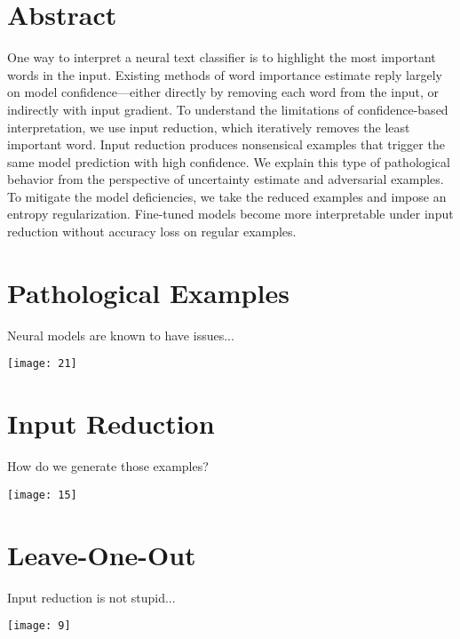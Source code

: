 \documentclass[a0,portrait]{a0poster}
\begin{document}
\begin{multicols}{2}

\large

\section*{Abstract}
One way to interpret a neural text classifier is to highlight the most important
words in the input. Existing methods of word importance estimate reply largely
on model confidence---either directly by removing each word from the input, or
indirectly with input gradient. To understand the limitations of
confidence-based interpretation, we use input reduction, which iteratively
removes the least important word. Input reduction produces nonsensical examples
that trigger the same model prediction with high confidence. We explain this
type of pathological behavior from the perspective of uncertainty estimate and
adversarial examples. To mitigate the model deficiencies, we take the reduced
examples and impose an entropy regularization. Fine-tuned models become more
interpretable under input reduction without accuracy loss on regular examples.
\vspace{0.6cm}

\section*{Pathological Examples}
Neural models are known to have issues...

\vspace{0.6cm}
\texttt{[image: 21]}
\vspace{0.6cm}

\section*{Input Reduction}
How do we generate those examples?

\begin{center}\vspace{0.6cm}
\texttt{[image: 15]}
\end{center}\vspace{0.6cm}


\section*{Leave-One-Out}
Input reduction is not stupid...

\begin{center}\vspace{0.6cm}
\texttt{[image: 9]}
\end{center}\vspace{0.6cm}


\end{multicols}
\end{document}
